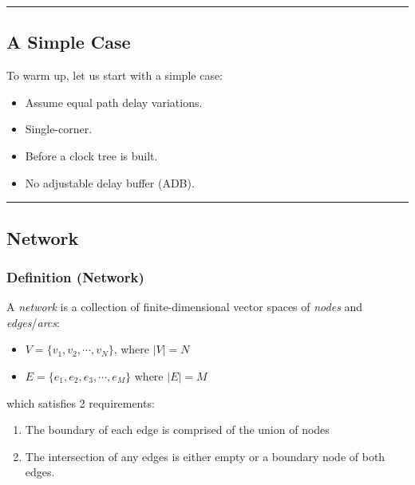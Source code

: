 \documentclass[
]{article}
\providecommand{\tightlist}{%
  \setlength{\itemsep}{0pt}\setlength{\parskip}{0pt}}
\begin{document}
\begin{center}\rule{0.5\linewidth}{0.5pt}\end{center}

\subsection{A Simple Case}\label{a-simple-case}

To warm up, let us start with a simple case:

\begin{itemize}
\tightlist
\item
  Assume equal path delay variations.
\item
  Single-corner.
\item
  Before a clock tree is built.
\item
  No adjustable delay buffer (ADB).
\end{itemize}

\begin{center}\rule{0.5\linewidth}{0.5pt}\end{center}

\subsection{Network}\label{network}

\subsubsection{Definition (Network)}\label{definition-network}

A \emph{network} is a collection of finite-dimensional vector spaces of
\emph{nodes} and \emph{edges}/\emph{arcs}:

\begin{itemize}
\tightlist
\item
  \(V = \{v_1, v_2, \cdots, v_N \}\), where \(|V| = N\)
\item
  \(E = \{e_1, e_2, e_3, \cdots, e_M \}\) where \(|E| = M\)
\end{itemize}

which satisfies 2 requirements:

\begin{enumerate}
\def\labelenumi{\arabic{enumi}.}
\tightlist
\item
  The boundary of each edge is comprised of the union of nodes
\item
  The intersection of any edges is either empty or a boundary node of
  both edges.
\end{enumerate}
\end{document}
